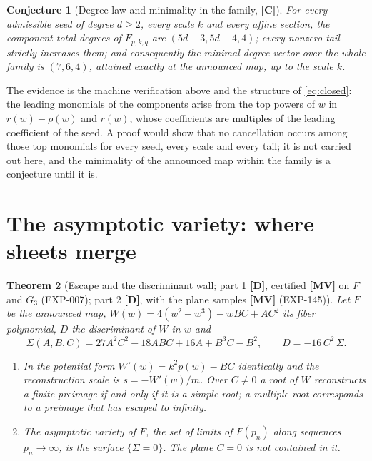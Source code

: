 \documentclass[11pt]{article}
\newtheorem{theorem}{Theorem}[section]
\newtheorem{conjecture}[theorem]{Conjecture}
\theoremstyle{definition}
\theoremstyle{remark}
\newcommand{\MV}{\textbf{[MV]}}
\newcommand{\DD}{\textbf{[D]}}
\newcommand{\CC}{\textbf{[C]}}
\begin{document}
\begin{conjecture}[Degree law and minimality in the family, {\CC}]\label{conj:degrees}
For every admissible seed of degree $d \ge 2$, every scale $k$ and every affine section, the component total degrees of $F_{p,k,q}$ are $(5d-3, 5d-4, 4)$; every nonzero tail strictly increases them; and consequently the minimal degree vector over the whole family is $(7,6,4)$, attained exactly at the announced map, up to the scale $k$.
\end{conjecture}

The evidence is the machine verification above and the structure of \eqref{eq:closed}: the leading monomials of the components arise from the top powers of $w$ in $r(w) - \rho(w)$ and $r(w)$, whose coefficients are multiples of the leading coefficient of the seed. A proof would show that no cancellation occurs among those top monomials for every seed, every scale and every tail; it is not carried out here, and the minimality of the announced map within the family is a conjecture until it is.

\section{The asymptotic variety: where sheets merge}\label{sec:asymptotic}

\begin{theorem}[Escape and the discriminant wall; part 1 {\DD}, certified {\MV} on $F$ and $G_3$ (EXP-007); part 2 {\DD}, with the plane samples {\MV} (EXP-145)]\label{thm:asymptotic}
Let $F$ be the announced map, $W(w) = 4(w^2 - w^3) - wBC + AC^2$ its fiber polynomial, $D$ the discriminant of $W$ in $w$ and
\begin{equation}\label{eq:sigma}
\Sigma(A,B,C) = 27A^2C^2 - 18ABC + 16A + B^3C - B^2, \qquad D = -16\,C^2\,\Sigma .
\end{equation}
\begin{enumerate}
\item In the potential form $W'(w) = k^2 p(w) - BC$ identically and the reconstruction scale is $s = -W'(w)/m$. Over $C \neq 0$ a root of $W$ reconstructs a finite preimage if and only if it is a simple root; a multiple root corresponds to a preimage that has escaped to infinity.
\item The asymptotic variety of $F$, the set of limits of $F(p_n)$ along sequences $p_n \to \infty$, is the surface $\{\Sigma = 0\}$. The plane $C = 0$ is not contained in it.
\end{enumerate}
\end{theorem}
\end{document}
